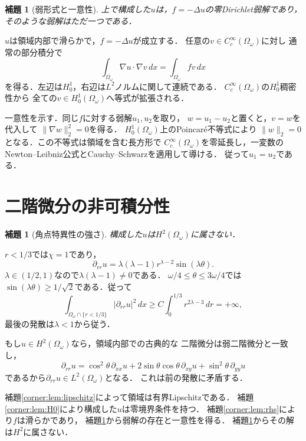 \documentclass[a5paper,10pt,onecolumn]{jsarticle}
\makeatletter
\theoremstyle{mathnotetheorem}
\newtheorem{lemma}[theorem]{補題}
\renewcommand{\proofname}{証明}
\renewenvironment{proof}[1][\proofname]{%
  \par\pushQED{\qed}\normalfont\topsep4\p@\@plus2\p@\relax
  \trivlist\item[\hskip\labelsep\bfseries #1]\ignorespaces
}{\popQED\endtrivlist\@endpefalse}
\makeatother
\begin{document}
\begin{lemma}[弱形式と一意性]\label{corner:lem:weak}
上で構成した$u$は，$f=-\Delta u$の零Dirichlet弱解であり，
そのような弱解はただ一つである．
\end{lemma}
\begin{proof}
$u$は領域内部で滑らかで，$f=-\Delta u$が成立する．
任意の$v\in C_c^\infty(\Omega_\omega)$に対し
通常の部分積分で
\[
 \int_{\Omega_\omega}\nabla u\cdot\nabla v\,dx
   =\int_{\Omega_\omega}fv\,dx
\]
を得る．左辺は$H_0^1$，右辺は$L^2$ノルムに関して連続である．
$C_c^\infty(\Omega_\omega)$の$H_0^1$稠密性から
全ての$v\in H_0^1(\Omega_\omega)$へ等式が拡張される．

一意性を示す．同じ$f$に対する弱解$u_1,u_2$を取り，
$w=u_1-u_2$と置くと，$v=w$を代入して
$\|\nabla w\|_2^2=0$を得る．
$H_0^1(\Omega_\omega)$上のPoincar\'e不等式により
$\|w\|_2=0$となる．この不等式は領域を含む長方形で
$C_c^\infty(\Omega_\omega)$を零延長し，一変数の
Newton--Leibniz公式とCauchy--Schwarzを適用して導ける．
従って$u_1=u_2$である．
\end{proof}

\section{二階微分の非可積分性}
\begin{lemma}[角点特異性の強さ]\label{corner:lem:notH2}
構成した$u$は$H^2(\Omega_\omega)$に属さない．
\end{lemma}
\begin{proof}
$r<1/3$では$\chi=1$であり，
\[
 \partial_{rr}u
   =\lambda(\lambda-1)r^{\lambda-2}\sin(\lambda\theta).
\]
$\lambda\in(1/2,1)$なので$\lambda(\lambda-1)\ne0$である．
$\omega/4\le\theta\le3\omega/4$では
$\sin(\lambda\theta)\ge1/\sqrt2$である．従って
\[
 \int_{\Omega_\omega\cap\{r<1/3\}}
       |\partial_{rr}u|^2\,dx
 \ge C\int_0^{1/3}r^{2\lambda-3}\,dr=+\infty,
\]
最後の発散は$\lambda<1$から従う．

もし$u\in H^2(\Omega_\omega)$なら，領域内部での古典的な
二階微分は弱二階微分と一致し，
\[
 \partial_{rr}u
 =\cos^2\theta\,\partial_{xx}u
  +2\sin\theta\cos\theta\,\partial_{xy}u
  +\sin^2\theta\,\partial_{yy}u
\]
であるから$\partial_{rr}u\in L^2(\Omega_\omega)$となる．
これは前の発散に矛盾する．
\end{proof}

\begin{proof}[定理\ref{corner:thm:corner}の証明]
補題\ref{corner:lem:lipschitz}によって領域は有界Lipschitzである．
補題\ref{corner:lem:H0}により構成した$u$は零境界条件を持つ．
補題\ref{corner:lem:rhs}により$f$は滑らかであり，
補題\ref{corner:lem:weak}から弱解の存在と一意性を得る．
補題\ref{corner:lem:notH2}からその解は$H^2$に属さない．
\end{proof}
\end{document}
